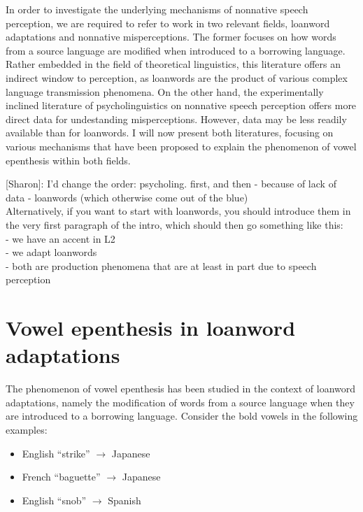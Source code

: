 In order to investigate the underlying mechanisms of nonnative speech perception, we are required to refer to work in two relevant fields, loanword adaptations and nonnative misperceptions.
The former focuses on how words from a source language are modified when introduced to a borrowing language. Rather embedded in the field of theoretical linguistics, this literature offers an indirect window to perception, as loanwords are the product of various complex language transmission phenomena. 
On the other hand, the experimentally inclined literature of psycholinguistics on nonnative speech perception offers more direct data for undestanding misperceptions. However, data may be less readily available than for loanwords. I will now present both literatures, focusing on various mechanisms that have been proposed to explain the phenomenon of vowel epenthesis within both fields.  

{\color{red}[Sharon]: I'd change the order: psycholing. first, and then - because of lack of data - loanwords (which otherwise come out of the blue) \\

Alternatively, if you want to start with loanwords, you should introduce them in the very first paragraph of the intro, which should then go something like this: \\
- we have an accent in L2 \\ 
- we adapt loanwords \\
- both are production phenomena that are at least in part due to speech perception}

\section{Vowel epenthesis in loanword adaptations}
The phenomenon of vowel epenthesis has been studied in the context of loanword adaptations, namely the modification of words from a source language when they are introduced to a borrowing language. Consider the bold vowels in the following examples:
\begin{itemize}
  \item English ``strike''  $\rightarrow$ Japanese 
  \item French ``baguette''  $\rightarrow$ Japanese  %
  \item English ``snob''  $\rightarrow$ Spanish 
  \end{itemize}
  
